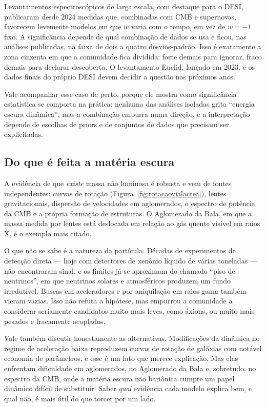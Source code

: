 \documentclass[11pt,a4paper]{article}
\begin{document}
Levantamentos espectroscópicos de larga escala, com destaque para o DESI, publicaram desde 2024 medidas que, combinadas com CMB e supernovas, favorecem levemente modelos em que $w$ varia com o tempo, em vez de $w=-1$ fixo. A significância depende de qual combinação de dados se usa e ficou, nas análises publicadas, na faixa de dois a quatro desvios-padrão. Isso é exatamente a zona cinzenta em que a comunidade fica dividida: forte demais para ignorar, fraco demais para declarar descoberta. O levantamento Euclid, lançado em 2023, e os dados finais do próprio DESI devem decidir a questão nos próximos anos.

Vale acompanhar esse caso de perto, porque ele mostra como significância estatística se comporta na prática: nenhuma das análises isoladas grita ``energia escura dinâmica'', mas a combinação empurra numa direção, e a interpretação depende de escolhas de priors e de conjuntos de dados que precisam ser explicitadas.

\subsection*{Do que é feita a matéria escura}

A evidência de que \emph{existe} massa não luminosa é robusta e vem de fontes independentes: curvas de rotação (Figura~\ref{fig:rotacaovialactea}), lentes gravitacionais, dispersão de velocidades em aglomerados, o espectro de potência da CMB e a própria formação de estruturas. O Aglomerado da Bala, em que a massa medida por lentes está deslocada em relação ao gás quente visível em raios X, é o exemplo mais citado.

O que não se sabe é a natureza da partícula. Décadas de experimentos de detecção direta --- hoje com detectores de xenônio líquido de várias toneladas --- não encontraram sinal, e os limites já se aproximam do chamado ``piso de neutrinos'', em que neutrinos solares e atmosféricos produzem um fundo irredutível. Buscas em aceleradores e por aniquilação em raios gama também vieram vazias. Isso não refuta a hipótese, mas empurrou a comunidade a considerar seriamente candidatos muito mais leves, como áxions, ou muito mais pesados e fracamente acoplados.

Vale também discutir honestamente as alternativas. Modificações da dinâmica no regime de aceleração baixa reproduzem curvas de rotação de galáxias com notável economia de parâmetros, e esse é um fato que merece explicação. Mas elas enfrentam dificuldade em aglomerados, no Aglomerado da Bala e, sobretudo, no espectro da CMB, onde a matéria escura não bariônica cumpre um papel dinâmico difícil de substituir. Saber \emph{qual} evidência cada modelo explica bem, e qual não, é mais útil do que torcer por um lado.
\end{document}

